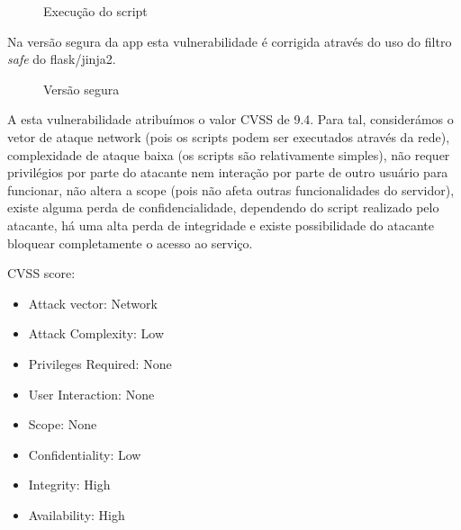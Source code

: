 \documentclass[12pt]{report}
\begin{document}
\begin{figure}[H]{
\centering
{
\caption{Execução do script}
}
}\end{figure}

Na versão segura da app esta vulnerabilidade é corrigida através do uso do filtro \emph{safe} do flask/jinja2.

\begin{figure}[H]{
\centering
{
\caption{Versão segura}
}
}\end{figure}
A esta vulnerabilidade atribuímos o valor CVSS de 9.4. Para tal, considerámos o vetor de ataque network (pois os scripts podem ser executados através da rede), complexidade de ataque baixa (os scripts são relativamente simples), não requer privilégios por parte do atacante nem interação por parte de outro usuário para funcionar, não altera a scope (pois não afeta outras funcionalidades do servidor), existe alguma perda de confidencialidade, dependendo do script realizado pelo atacante, há uma alta perda de integridade e existe possibilidade do atacante bloquear completamente o acesso ao serviço.\par
CVSS score: \begin{itemize}
  \item Attack vector: Network
  \item Attack Complexity: Low
  \item Privileges Required: None
  \item User Interaction: None
  \item Scope: None
  \item Confidentiality: Low
  \item Integrity: High
  \item Availability: High
\end{itemize}
\end{document}
